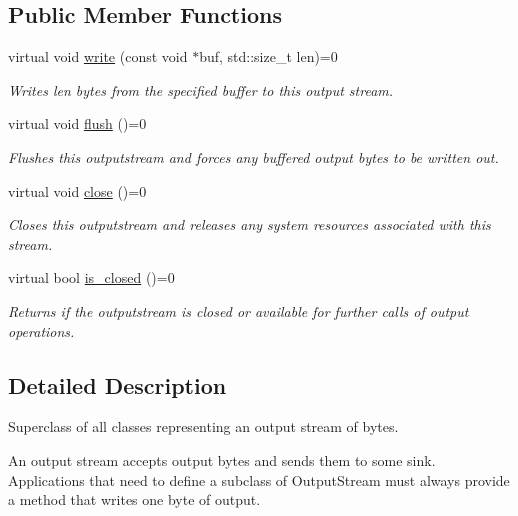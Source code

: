 \subsection*{Public Member Functions}
\begin{DoxyCompactItemize}
\item 
virtual void \hyperlink{structdevfix_1_1base_1_1io_1_1outputstream_ac7e5fcd6883c7c8f53356a4eb8284c00}{write} (const void $\ast$buf, std\+::size\+\_\+t len)=0
\begin{DoxyCompactList}\small\item\em Writes len bytes from the specified buffer to this output stream. \end{DoxyCompactList}\item 
virtual void \hyperlink{structdevfix_1_1base_1_1io_1_1outputstream_a3fe3b34675a2d70331e6ca235388e0cc}{flush} ()=0
\begin{DoxyCompactList}\small\item\em Flushes this {\itshape outputstream} and forces any buffered output bytes to be written out. \end{DoxyCompactList}\item 
virtual void \hyperlink{structdevfix_1_1base_1_1io_1_1outputstream_a060c2e7040e6bb831b8150f64bd8abf7}{close} ()=0
\begin{DoxyCompactList}\small\item\em Closes this {\itshape outputstream} and releases any system resources associated with this stream. \end{DoxyCompactList}\item 
virtual bool \hyperlink{structdevfix_1_1base_1_1io_1_1outputstream_a52bd2eac8f6fbc496eab5138a48d2f06}{is\+\_\+closed} ()=0
\begin{DoxyCompactList}\small\item\em Returns if the {\itshape outputstream} is closed or available for further calls of output operations. \end{DoxyCompactList}\end{DoxyCompactItemize}


\subsection{Detailed Description}
Superclass of all classes representing an output stream of bytes. 

An output stream accepts output bytes and sends them to some sink. Applications that need to define a subclass of Output\+Stream must always provide a method that writes one byte of output. 

